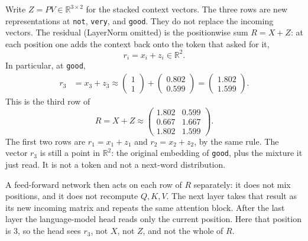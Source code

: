 \documentclass[11pt,a4paper]{article}
\theoremstyle{definition}
\begin{document}
\begin{example}
Write \(Z=PV\in\mathbb{R}^{3\times 2}\) for the stacked context vectors. The three rows are new representations at \texttt{not}, \texttt{very}, and \texttt{good}. They do not replace the incoming vectors. The residual (LayerNorm omitted) is the positionwise sum \(R=X+Z\): at each position one adds the context back onto the token that asked for it,
\[
r_i=x_i+z_i\in\mathbb{R}^{2}.
\]
In particular, at \texttt{good},
\begin{align*}
r_3
&=x_3+z_3
\approx
\begin{pmatrix}1\\1\end{pmatrix}
+\begin{pmatrix}0.802\\0.599\end{pmatrix}
=\begin{pmatrix}1.802\\1.599\end{pmatrix}.
\end{align*}
This is the third row of
\[
R=X+Z
\approx
\begin{pmatrix}
1.802&0.599\\
0.667&1.667\\
1.802&1.599
\end{pmatrix}.
\]
The first two rows are \(r_1=x_1+z_1\) and \(r_2=x_2+z_2\), by the same rule. The vector \(r_3\) is still a point in \(\mathbb{R}^{2}\): the original embedding of \texttt{good}, plus the mixture it just read. It is not a token and not a next-word distribution.

A feed-forward network then acts on each row of \(R\) separately: it does not mix positions, and it does not recompute \(Q,K,V\). The next layer takes that result as its new incoming matrix and repeats the same attention block. After the last layer the language-model head reads only the current position. Here that position is \(3\), so the head sees \(r_3\), not \(X\), not \(Z\), and not the whole of \(R\).


\end{example}
\end{document}
